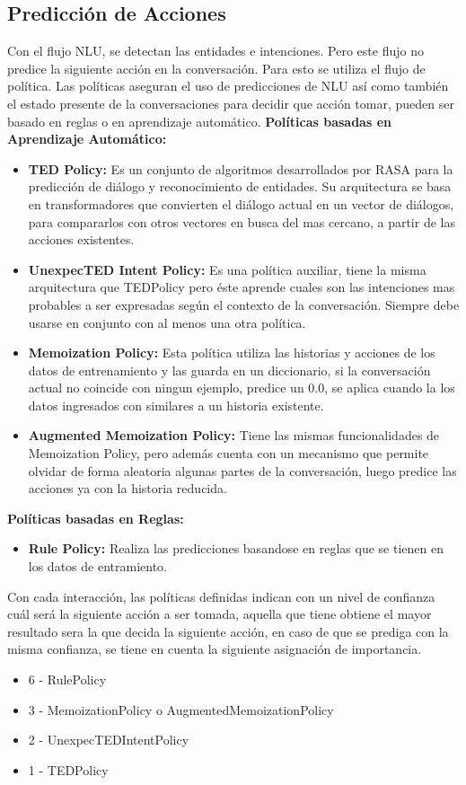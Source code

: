 \subsection{Predicción de Acciones}
Con el flujo NLU, se detectan las entidades e intenciones. Pero este flujo no predice la siguiente acción en la 
conversación. Para esto se utiliza el flujo de política. Las políticas aseguran el uso de predicciones de NLU así como 
también el estado presente de la conversaciones para decidir que acción tomar, pueden ser basado en reglas o en aprendizaje automático.
\textbf{Políticas basadas en Aprendizaje Automático:}
\begin{itemize}
    \item \textbf{TED Policy:}
    Es un conjunto de algoritmos desarrollados por RASA para la predicción de diálogo y reconocimiento de entidades. Su arquitectura se basa en transformadores que convierten el diálogo actual en un vector de diálogos, para compararlos con otros vectores en busca del mas cercano, a partir de las acciones existentes.\cite{TED_Policy}
    \item \textbf{UnexpecTED Intent Policy:} Es una política auxiliar, tiene la misma arquitectura que TEDPolicy pero éste aprende cuales son las intenciones mas probables a ser expresadas según el contexto de la conversación. Siempre debe usarse en conjunto con al menos una otra política.\cite{UnexpecTED}
    \item \textbf{Memoization Policy: }Esta política utiliza las historias y acciones de los datos de entrenamiento y las guarda en un diccionario, si la conversación actual no coincide con ningun ejemplo, predice un 0.0, se aplica cuando la los datos ingresados con similares a un historia existente.\cite{MemoizationPolicy}
    \item \textbf{Augmented Memoization Policy: } Tiene las mismas funcionalidades de Memoization Policy, pero además cuenta con un mecanismo que permite olvidar de forma aleatoria algunas partes de la conversación, luego predice las acciones ya con la historia reducida.\cite{AugmentedMemoizationPolicy}
\end{itemize}
\textbf{Políticas basadas en Reglas:}
\begin{itemize}
    \item \textbf{Rule Policy:} Realiza las predicciones basandose en reglas que se tienen en los datos de entramiento.
\end{itemize}
\indent Con cada interacción, las políticas definidas indican con un nivel de confianza cuál será la siguiente acción a ser tomada, aquella que tiene obtiene el mayor resultado sera la que decida la siguiente acción, en caso de que se prediga con la misma confianza, se tiene en cuenta la siguiente asignación de importancia.
\begin{itemize}
    \item 6 - RulePolicy
    \item 3 - MemoizationPolicy o AugmentedMemoizationPolicy
    \item 2 -  UnexpecTEDIntentPolicy
    \item 1 - TEDPolicy
\end{itemize}